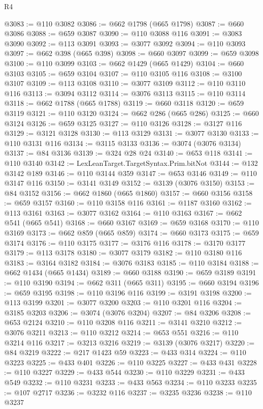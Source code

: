 \begin{lexlean}{R4}
\begin{coremodule}
@3083 := @110 @3082
@3086 := @662 @1798 (@665 @1798)
@3087 := @660 @3086
@3088 := @659 @3087
@3090 := @110 @3088 @116
@3091 := @3083 @3090
@3092 := @113 @3091
@3093 := @3077 @3092
@3094 := @110 @3093
@3097 := @662 @398 (@665 @398)
@3098 := @660 @3097
@3099 := @659 @3098
@3100 := @110 @3099
@3103 := @662 @1429 (@665 @1429)
@3104 := @660 @3103
@3105 := @659 @3104
@3107 := @110 @3105 @116
@3108 := @3100 @3107
@3109 := @113 @3108
@3110 := @3077 @3109
@3112 := @110 @3110 @116
@3113 := @3094 @3112
@3114 := @3076 @3113
@3115 := @110 @3114
@3118 := @662 @1788 (@665 @1788)
@3119 := @660 @3118
@3120 := @659 @3119
@3121 := @110 @3120
@3124 := @662 @286 (@665 @286)
@3125 := @660 @3124
@3126 := @659 @3125
@3127 := @110 @3126
@3128 := @3127 @116
@3129 := @3121 @3128
@3130 := @113 @3129
@3131 := @3077 @3130
@3133 := @110 @3131 @116
@3134 := @3115 @3133
@3136 := @3074 (@3076 @3134)
@3137 := @84 @3136
@3139 := @324 @28 @24
@3140 := @653 @118
@3141 := @110 @3140
@3142 := LexLeanTarget.TargetSyntax.Prim.bitNot
@3144 := @132 @3142 @189
@3146 := @110 @3144 @359
@3147 := @653 @3146
@3149 := @110 @3147 @116
@3150 := @3141 @3149
@3152 := @3139 (@3076 @3150)
@3153 := @84 @3152
@3156 := @662 @1860 (@665 @1860)
@3157 := @660 @3156
@3158 := @659 @3157
@3160 := @110 @3158 @116
@3161 := @1187 @3160
@3162 := @113 @3161
@3163 := @3077 @3162
@3164 := @110 @3163
@3167 := @662 @541 (@665 @541)
@3168 := @660 @3167
@3169 := @659 @3168
@3170 := @110 @3169
@3173 := @662 @859 (@665 @859)
@3174 := @660 @3173
@3175 := @659 @3174
@3176 := @110 @3175
@3177 := @3176 @116
@3178 := @3170 @3177
@3179 := @113 @3178
@3180 := @3077 @3179
@3182 := @110 @3180 @116
@3183 := @3164 @3182
@3184 := @3076 @3183
@3185 := @110 @3184
@3188 := @662 @1434 (@665 @1434)
@3189 := @660 @3188
@3190 := @659 @3189
@3191 := @110 @3190
@3194 := @662 @311 (@665 @311)
@3195 := @660 @3194
@3196 := @659 @3195
@3198 := @110 @3196 @116
@3199 := @3191 @3198
@3200 := @113 @3199
@3201 := @3077 @3200
@3203 := @110 @3201 @116
@3204 := @3185 @3203
@3206 := @3074 (@3076 @3204)
@3207 := @84 @3206
@3208 := @653 @2124
@3210 := @110 @3208 @116
@3211 := @3141 @3210
@3212 := @3076 @3211
@3213 := @110 @3212
@3214 := @653 @551
@3216 := @110 @3214 @116
@3217 := @3213 @3216
@3219 := @3139 (@3076 @3217)
@3220 := @84 @3219
@3222 := @217 @1423 @59
@3223 := @433 @314
@3224 := @110 @3223
@3225 := @433 @401
@3226 := @110 @3225
@3227 := @433 @431
@3228 := @110 @3227
@3229 := @433 @544
@3230 := @110 @3229
@3231 := @433 @549
@3232 := @110 @3231
@3233 := @433 @563
@3234 := @110 @3233
@3235 := @107 @2717
@3236 := @3232 @116
@3237 := @3235 @3236
@3238 := @110 @3237

\end{coremodule}
\end{lexlean}
